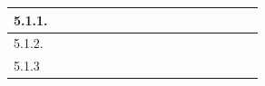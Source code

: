 \documentclass[12pt]{article}
\begin{document}
\begin{table}[H]
{\begin{tabular}{|lllllllllllllllll|}
			\multicolumn{1}{|l|}{5.1.1.}                                                       & \multicolumn{1}{l|}{\cellcolor[HTML]{9AFF99}}  & \multicolumn{1}{l|}{}                          & \multicolumn{1}{l|}{}                          & \multicolumn{1}{l|}{}                          & \multicolumn{1}{l|}{}                          & \multicolumn{1}{l|}{}                          & \multicolumn{1}{l|}{}                          & \multicolumn{1}{l|}{}                          & \multicolumn{1}{l|}{}                          & \multicolumn{1}{l|}{}                           & \multicolumn{1}{l|}{}                           & \multicolumn{1}{l|}{}                           & \multicolumn{1}{l|}{}                           & \multicolumn{1}{l|}{}                           & \multicolumn{1}{l|}{}                           &                            \\ \hline
			\multicolumn{1}{|l|}{5.1.2.}                                                       & \multicolumn{1}{l|}{}                          & \multicolumn{1}{l|}{\cellcolor[HTML]{9AFF99}}  & \multicolumn{1}{l|}{\cellcolor[HTML]{9AFF99}}  & \multicolumn{1}{l|}{\cellcolor[HTML]{9AFF99}}  & \multicolumn{1}{l|}{\cellcolor[HTML]{96FFFB}}  & \multicolumn{1}{l|}{}                          & \multicolumn{1}{l|}{}                          & \multicolumn{1}{l|}{}                          & \multicolumn{1}{l|}{}                          & \multicolumn{1}{l|}{}                           & \multicolumn{1}{l|}{}                           & \multicolumn{1}{l|}{}                           & \multicolumn{1}{l|}{}                           & \multicolumn{1}{l|}{}                           & \multicolumn{1}{l|}{}                           &                            \\ \hline
			\multicolumn{1}{|l|}{5.1.3}                                                        & \multicolumn{1}{l|}{}                          & \multicolumn{1}{l|}{}                          & \multicolumn{1}{l|}{}                          & \multicolumn{1}{l|}{}                          &
			\multicolumn{1}{l|}{}                                                              & \multicolumn{1}{l|}{\cellcolor[HTML]{96FFFB}}  & \multicolumn{1}{l|}{\cellcolor[HTML]{96FFFB}}  & \multicolumn{1}{l|}{\cellcolor[HTML]{96FFFB}}  & \multicolumn{1}{l|}{\cellcolor[HTML]{CBCEFB}}  & \multicolumn{1}{l|}{\cellcolor[HTML]{CBCEFB}}  & \multicolumn{1}{l|}{}                          & \multicolumn{1}{l|}{}                          & \multicolumn{1}{l|}{}                          & \multicolumn{1}{l|}{}                          & \multicolumn{1}{l|}{}                           &                                                                                                                                                                                                                                                                                      \\ \hline

\end{tabular}}
\end{table}
\end{document}
